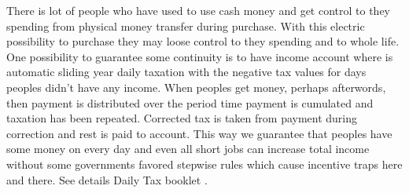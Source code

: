 There is lot of people who have used to use cash money and get control to they
spending from physical money transfer during purchase. With this electric
possibility to purchase they may loose control to they spending and to whole
life. One possibility to guarantee some continuity is to have income account
where is automatic sliding year daily taxation with the negative tax values
for days peoples didn't have any income. When peoples get money, perhaps
afterwords, then payment is distributed over the period time payment is
cumulated and taxation has been repeated. Corrected tax is taken from payment
during correction and rest is paid to account. This way we guarantee that
peoples have some money on every day and even all short jobs can increase
total income without some governments favored stepwise rules which cause
incentive traps here and there. See details Daily Tax booklet\cite{DayTax}
.

